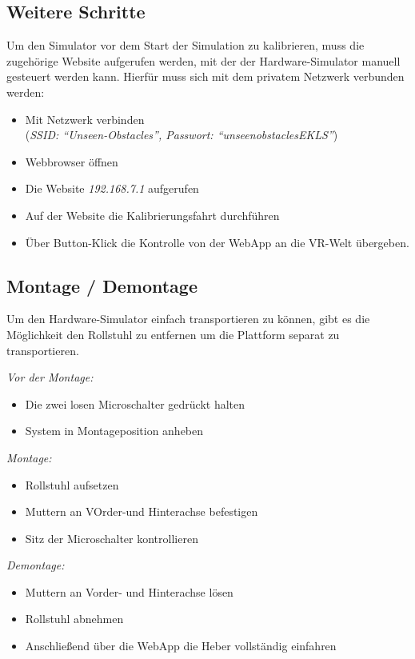 \subsection{Weitere Schritte}
Um den Simulator vor dem Start der Simulation zu kalibrieren, muss die zugehörige Website aufgerufen werden, mit der der Hardware-Simulator manuell gesteuert werden kann. Hierfür muss sich mit dem privatem Netzwerk verbunden werden:
\begin{itemize}
    \item Mit Netzwerk verbinden \\(\emph{SSID: "`Unseen-Obstacles"', Passwort: "`unseenobstaclesEKLS"'})
    \item Webbrowser öffnen
    \item Die Website \emph{192.168.7.1} aufgerufen
    \item Auf der Website die Kalibrierungsfahrt durchführen
    \item Über Button-Klick die Kontrolle von der WebApp an die VR-Welt übergeben.
\end{itemize}

\subsection{Montage / Demontage}
Um den Hardware-Simulator einfach transportieren zu können, gibt es die Möglichkeit den Rollstuhl zu entfernen um die Plattform separat zu transportieren.

\emph{Vor der Montage:}
\begin{itemize}
    \item Die zwei losen Microschalter gedrückt halten
    \item System in Montageposition anheben
\end{itemize}

\emph{Montage:}
\begin{itemize}
    \item Rollstuhl aufsetzen
    \item Muttern an VOrder-und Hinterachse befestigen
    \item Sitz der Microschalter  kontrollieren
\end{itemize}

\emph{Demontage:}
\begin{itemize}
    \item Muttern an Vorder- und Hinterachse lösen
    \item Rollstuhl abnehmen
    \item Anschließend über die WebApp die Heber vollständig einfahren
\end{itemize}
